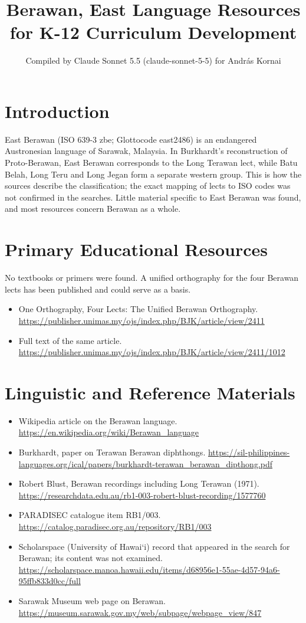 \documentclass[12pt]{article}
\title{Berawan, East Language Resources for K-12 Curriculum Development}
\author{Compiled by Claude Sonnet 5.5 (claude-sonnet-5-5) for Andr\'as Kornai}
\date{}
\begin{document}
\maketitle

\section{Introduction}
East Berawan (ISO 639-3 zbe; Glottocode east2486) is an endangered Austronesian language of Sarawak, Malaysia. In Burkhardt's reconstruction of Proto-Berawan, East Berawan corresponds to the Long Terawan lect, while Batu Belah, Long Teru and Long Jegan form a separate western group. This is how the sources describe the classification; the exact mapping of lects to ISO codes was not confirmed in the searches. Little material specific to East Berawan was found, and most resources concern Berawan as a whole.

\section{Primary Educational Resources}
No textbooks or primers were found. A unified orthography for the four Berawan lects has been published and could serve as a basis.
\begin{itemize}
\item One Orthography, Four Lects: The Unified Berawan Orthography. \url{https://publisher.unimas.my/ojs/index.php/BJK/article/view/2411}
\item Full text of the same article. \url{https://publisher.unimas.my/ojs/index.php/BJK/article/view/2411/1012}
\end{itemize}

\section{Linguistic and Reference Materials}
\begin{itemize}
\item Wikipedia article on the Berawan language. \url{https://en.wikipedia.org/wiki/Berawan_language}
\item Burkhardt, paper on Terawan Berawan diphthongs. \url{https://sil-philippines-languages.org/ical/papers/burkhardt-terawan_berawan_dipthong.pdf}
\item Robert Blust, Berawan recordings including Long Terawan (1971). \url{https://researchdata.edu.au/rb1-003-robert-blust-recording/1577760}
\item PARADISEC catalogue item RB1/003. \url{https://catalog.paradisec.org.au/repository/RB1/003}
\item Scholarspace (University of Hawai\textquoteleft i) record that appeared in the search for Berawan; its content was not examined. \url{https://scholarspace.manoa.hawaii.edu/items/d68956e1-55ae-4d57-94a6-95ffb833d0cc/full}
\item Sarawak Museum web page on Berawan. \url{https://museum.sarawak.gov.my/web/subpage/webpage_view/847}
\end{itemize}
\end{document}

